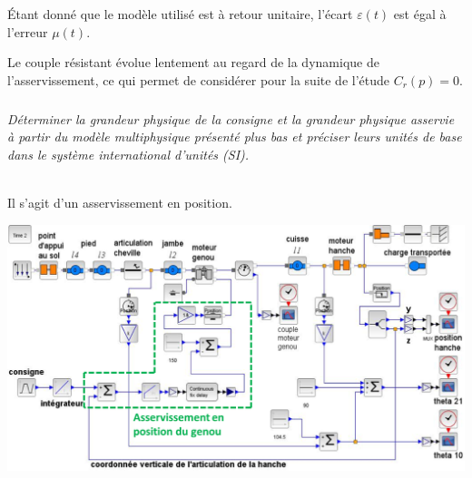 \documentclass[10pt,fleqn]{article} %
\begin{document}
\begin{multicols}{2}
Étant donné que le modèle utilisé est à retour unitaire, l’écart $\varepsilon(t)$ est égal à l’erreur $\mu(t)$. 

\begin{hypo}
Le couple résistant évolue lentement au regard de la dynamique de l’asservissement, ce qui permet de considérer
pour la suite de l’étude $C_r(p)=0$.
\end{hypo}

\fi

\subparagraph{}\textit{Déterminer la grandeur physique de la consigne et la grandeur physique asservie à partir du modèle multiphysique présenté plus bas et préciser leurs unités de base dans le système international d’unités (SI).}
\ifprof
\begin{corrige}~\\
Il s'agit d'un asservissement en position. 

\begin{center}
\includegraphics[width=\linewidth]{images/cor_01}
\end{center}
\end{corrige}


\end{multicols}
\end{document}
